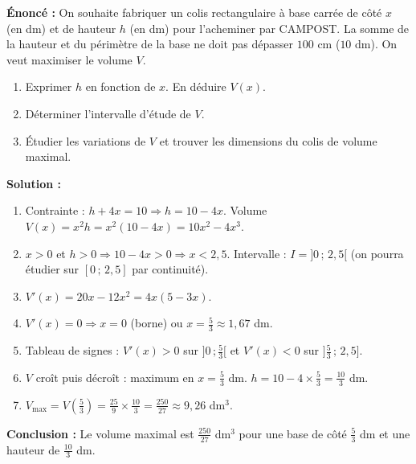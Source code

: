 \documentclass[11pt]{article}
\begin{document}
\begin{exemplebox}
\textbf{Énoncé :} On souhaite fabriquer un colis rectangulaire à base carrée de côté $x$ (en dm) et de hauteur $h$ (en dm) pour l'acheminer par CAMPOST. La somme de la hauteur et du périmètre de la base ne doit pas dépasser $100$ cm ($10$ dm). On veut maximiser le volume $V$.
\begin{enumerate}
  \item Exprimer $h$ en fonction de $x$. En déduire $V(x)$.
  \item Déterminer l'intervalle d'étude de $V$.
  \item Étudier les variations de $V$ et trouver les dimensions du colis de volume maximal.
\end{enumerate}
\textbf{Solution :}
\begin{enumerate}
  \item Contrainte : $h + 4x = 10 \Rightarrow h = 10 - 4x$. Volume $V(x) = x^2 h = x^2(10-4x) = 10x^2 - 4x^3$.
  \item $x > 0$ et $h > 0 \Rightarrow 10-4x > 0 \Rightarrow x < 2,5$. Intervalle : $I = ]0\,;\,2,5[$ (on pourra étudier sur $[0\,;\,2,5]$ par continuité).
  \item $V'(x) = 20x - 12x^2 = 4x(5 - 3x)$.
  \item $V'(x)=0 \Rightarrow x=0$ (borne) ou $x = \frac{5}{3} \approx 1,67$ dm.
  \item Tableau de signes : $V'(x) > 0$ sur $]0\,;\frac{5}{3}[$ et $V'(x) < 0$ sur $]\frac{5}{3}\,;\,2,5]$.
  \item $V$ croît puis décroît : maximum en $x = \frac{5}{3}$ dm. $h = 10 - 4\times\frac{5}{3} = \frac{10}{3}$ dm.
  \item $V_{\text{max}} = V(\frac{5}{3}) = \frac{25}{9} \times \frac{10}{3} = \frac{250}{27} \approx 9,26$ dm$^3$.
\end{enumerate}
\textbf{Conclusion :} Le volume maximal est $\frac{250}{27}$ dm$^3$ pour une base de côté $\frac{5}{3}$ dm et une hauteur de $\frac{10}{3}$ dm.
\end{exemplebox}
\end{document}
